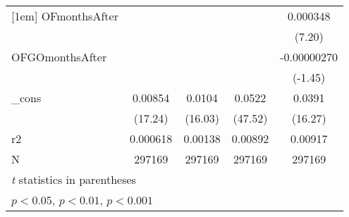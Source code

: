 \begin{table}[htbp]
\begin{tabular}{l*{4}{c}}
[1em]
OFmonthsAfter&                     &                     &                     &    0.000348\sym{***}\\
            &                     &                     &                     &      (7.20)         \\
[1em]
OFGOmonthsAfter&                     &                     &                     & -0.00000270         \\
            &                     &                     &                     &     (-1.45)         \\
[1em]
\_cons      &     0.00854\sym{***}&      0.0104\sym{***}&      0.0522\sym{***}&      0.0391\sym{***}\\
            &     (17.24)         &     (16.03)         &     (47.52)         &     (16.27)         \\
\hline
r2          &    0.000618         &     0.00138         &     0.00892         &     0.00917         \\
N           &      297169         &      297169         &      297169         &      297169         \\
\hline\hline
\multicolumn{5}{l}{\footnotesize \textit{t} statistics in parentheses}\\
\multicolumn{5}{l}{\footnotesize \sym{*} \(p<0.05\), \sym{**} \(p<0.01\), \sym{***} \(p<0.001\)}\\
\end{tabular}
\end{table}
